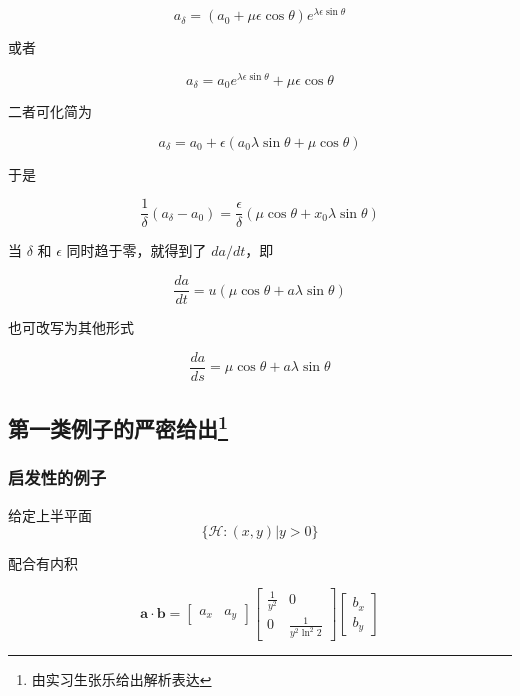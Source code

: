 \documentclass[a4paper,12pt]{article}
\numberwithin{problem}{section}
\numberwithin{definition}{section}
\numberwithin{lemma}{section}
\numberwithin{proposition}{section}
\numberwithin{theorem}{section}
\numberwithin{grammar}{section}
\numberwithin{program}{section}
\numberwithin{convention}{section}
\numberwithin{corollary}{section}
\begin{document}
\begin{equation}
    a_{\delta} = (a_0 + \mu \epsilon \cos \theta)e^{\lambda \epsilon \sin \theta}
\end{equation}

或者

\begin{equation}
    a_{\delta} = a_0 e^{\lambda \epsilon \sin \theta} + \mu \epsilon \cos \theta
\end{equation}

二者可化简为

\begin{equation}
    a_{\delta} = a_0 + \epsilon (a_0 \lambda \sin \theta + \mu \cos \theta)
\end{equation}

于是

\begin{equation}
    \frac{1}{\delta} (a_{\delta} - a_0) = \frac{\epsilon}{\delta} (\mu \cos \theta + x_0 \lambda \sin \theta)
\end{equation}

当 $\delta$ 和 $\epsilon$ 同时趋于零，就得到了 $da / dt$，即

\begin{equation}
    \frac{da}{dt} = u (\mu \cos \theta + a \lambda \sin \theta)
\end{equation}

也可改写为其他形式

\begin{equation}
    \frac{da}{ds} = \mu \cos \theta + a \lambda \sin \theta\label{eq:flow}
\end{equation}

\subsection{第一类例子的严密给出\footnote{由实习生张乐给出解析表达}}
\label{sec:first-example}

\subsubsection{启发性的例子}
给定上半平面
\[
\{\mathcal{H}: (x, y) | y > 0 \}
\]

配合有内积

\[
\mathbf{a} \cdot \mathbf{b} = \begin{bmatrix} a_x & a_y \end{bmatrix} \begin{bmatrix} \frac{1}{y^2} & 0 \\ 0 & \frac{1}{y^2\ln^2{2}} \end{bmatrix} \begin{bmatrix} b_x \\ b_y \end{bmatrix}
\]
\end{document}
